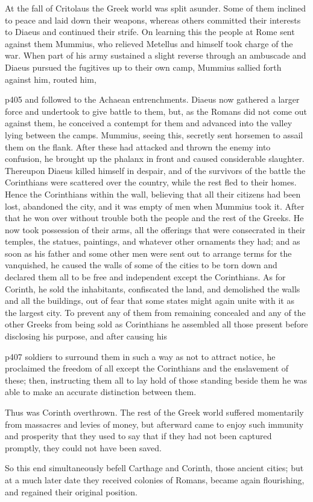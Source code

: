 At the fall of Critolaus the Greek world was split asunder. Some of them inclined to peace and laid down their weapons, whereas others committed their interests to Diaeus and continued their strife. On learning this the people at Rome sent against them Mummius, who relieved Metellus and himself took charge of the war. When part of his army sustained a slight reverse through an ambuscade and Diaeus pursued the fugitives up to their own camp, Mummius sallied forth against him, routed him,

p405 and followed to the Achaean entrenchments. Diaeus now gathered a larger force and undertook to give battle to them, but, as the Romans did not come out against them, he conceived a contempt for them and advanced into the valley lying between the camps. Mummius, seeing this, secretly sent horsemen to assail them on the flank. After these had attacked and thrown the enemy into confusion, he brought up the phalanx in front and caused considerable slaughter. Thereupon Diaeus killed himself in despair, and of the survivors of the battle the Corinthians were scattered over the country, while the rest fled to their homes. Hence the Corinthians within the wall, believing that all their citizens had been lost, abandoned the city, and it was empty of men when Mummius took it. After that he won over without trouble both the people and the rest of the Greeks. He now took possession of their arms, all the offerings that were consecrated in their temples, the statues, paintings, and whatever other ornaments they had; and as soon as his father and some other men were sent out to arrange terms for the vanquished, he caused the walls of some of the cities to be torn down and declared them all to be free and independent except the Corinthians. As for Corinth, he sold the inhabitants, confiscated the land, and demolished the walls and all the buildings, out of fear that some states might again unite with it as the largest city. To prevent any of them from remaining concealed and any of the other Greeks from being sold as Corinthians he assembled all those present before disclosing his purpose, and after causing his

p407 soldiers to surround them in such a way as not to attract notice, he proclaimed the freedom of all except the Corinthians and the enslavement of these; then, instructing them all to lay hold of those standing beside them he was able to make an accurate distinction between them.

Thus was Corinth overthrown. The rest of the Greek world suffered momentarily from massacres and levies of money, but afterward came to enjoy such immunity and prosperity that they used to say that if they had not been captured promptly, they could not have been saved.

So this end simultaneously befell Carthage and Corinth, those ancient cities; but at a much later date they received colonies of Romans, became again flourishing, and regained their original position.
